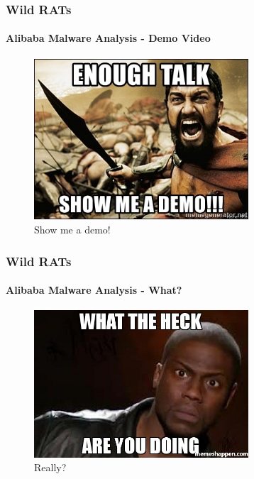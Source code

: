 \documentclass[aspectratio=169]{beamer}
\begin{document}
\begin{frame}
  \frametitle{Wild RATs}
  \framesubtitle{Alibaba Malware Analysis - Demo Video}
  \begin{center}
    \begin{figure}
      \includegraphics[width=8cm,keepaspectratio]{show_me_a_demo}
      \caption{Show me a demo!}
    \end{figure}
  \end{center}
\end{frame}

\begin{frame}
  \frametitle{Wild RATs}
  \framesubtitle{Alibaba Malware Analysis - What?}
  \begin{center}
    \begin{figure}
      \includegraphics[width=8cm,keepaspectratio]{what_are_you_doing}
      \caption{Really?}
    \end{figure}
  \end{center}
\end{frame}
\end{document}
